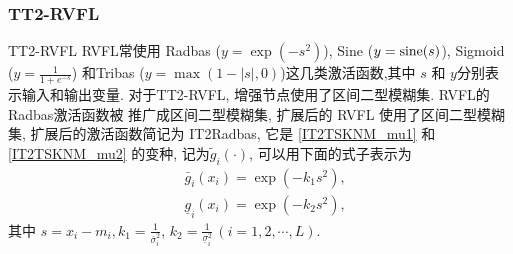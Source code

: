 {\subsubsection{TT2-RVFL} {TT2-RVFL}
RVFL常使用 Radbas ($y = \exp(-s^2)$), Sine ($y = \textup{sine} (s)$), Sigmoid ($y = \frac 1 {1+e^{-s} } $) 和Tribas ($y = \max(1 - |s|, 0)$)这几类激活函数,其中 $s$ 和 $y$分别表示输入和输出变量.
对于TT2-RVFL, 增强节点使用了区间二型模糊集. RVFL的 Radbas激活函数被 推广成区间二型模糊集, 扩展后的 RVFL 使用了区间二型模糊集, 扩展后的激活函数简记为 IT2Radbas, 它是 \eqref{IT2TSKNM_mu1} 和 \eqref{IT2TSKNM_mu2} 的变种,  记为$\tilde g_i(\cdot)$, 可以用下面的式子表示为
 \begin{align}
  &\bar{g} _{i} (x_i)=\exp(-k_1 s^2),\label{IT2TSKNM_g1} \\
  &\underline{g} _{i} (x_i)=\exp(-k_2 s^2),\label{IT2TSKNM_g2}
\end{align}
其中 $s=x_i-m_{i} , k_1=\frac{1} {\bar{\sigma} ^2_{i} } $, $k_2=\frac{1} {\underline{\sigma} ^2_{i} } \, (i=1,2,\cdots, L)$.

}

